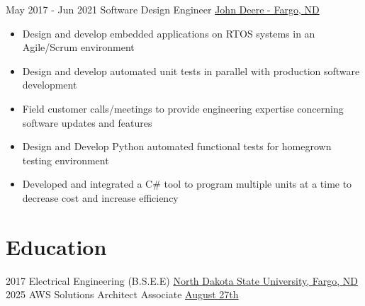 \documentclass[letterpaper]{tenseconds} %
\begin{document}
\begin{twenty}
	\twentyitem
	{May 2017 -}
	{Jun 2021}
	{Software Design Engineer}
	{\href{https://www.deere.com/en/index.html}{John Deere - Fargo, ND}}
	{}
	{\begin{itemize}
		\item Design and develop embedded applications on RTOS systems in an Agile/Scrum environment
		\item Design and develop automated unit tests in parallel with production software development
		\item Field customer calls/meetings to provide engineering expertise concerning software updates and features
    \item Design and Develop Python automated functional tests for homegrown testing environment
    \item Developed and integrated a C\# tool to program multiple units at a time to decrease cost and increase efficiency
		\end{itemize}}
\end{twenty}

\section{Education}
\begin{twenty} %
	\twentyitem
	{2017}
	{}
	{Electrical Engineering \textnormal{(B.S.E.E)}}
	{\href{https://www.ndsu.edu/}{North Dakota State University, Fargo, ND}}
  {}
	{}
	\twentyitem
	{2025}
	{}
  {AWS Solutions Architect Associate}
  {\href{https://aws.amazon.com/certification/certified-solutions-architect-associate/}{August 27th}}
	{}
	{}
\end{twenty}
\end{document}

